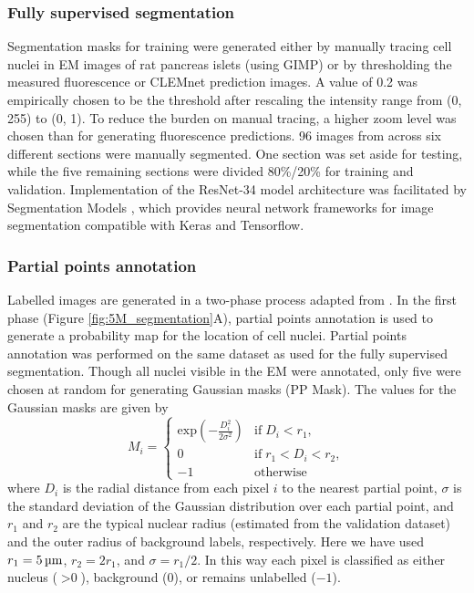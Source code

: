 \subsubsection{Fully supervised segmentation}

Segmentation masks for training were generated either by manually tracing cell nuclei in EM images of rat pancreas islets (using GIMP) or by thresholding the measured fluorescence or CLEMnet prediction images. A value of 0.2 was empirically chosen to be the threshold after rescaling the intensity range from (0, 255) to (0, 1). To reduce the burden on manual tracing, a higher zoom level was chosen than for generating fluorescence predictions. 96 images from across six different sections were manually segmented. One section was set aside for testing, while the five remaining sections were divided 80\%/20\% for training and validation. Implementation of the ResNet-34 model architecture was facilitated by Segmentation Models \cite{Yakubovskiy:2019}, which provides neural network frameworks for image segmentation compatible with Keras and Tensorflow.


\subsubsection{Partial points annotation}

Labelled images are generated in a two-phase process adapted from \textcite{qu2020weakly}. In the first phase (Figure \ref{fig:5M_segmentation}A), partial points annotation is used to generate a probability map for the location of cell nuclei. Partial points annotation was performed on the same dataset as used for the fully supervised segmentation. Though all nuclei visible in the EM were annotated, only five were chosen at random for generating Gaussian masks (PP Mask). The values for the Gaussian masks are given by
%
\begin{equation}
    M_i = 
    \begin{cases}
        \text{exp}\left({-\frac{D_i^2}{2\sigma^2}}\right) & \text{if}\; D_i < r_1, \\
        0 & \text{if}\; r_1 < D_i < r_2, \\
        -1 & \text{otherwise}
    \end{cases}
\end{equation}
%
where $D_i$ is the radial distance from each pixel $i$ to the nearest partial point, $\sigma$ is the standard deviation of the Gaussian distribution over each partial point, and $r_1$ and $r_2$ are the typical nuclear radius (estimated from the validation dataset) and the outer radius of background labels, respectively. Here we have used $r_1=\text{\SI{5}{\micro\meter}}$, $r_2 = 2 r_1$, and $\sigma = r_1 / 2$. In this way each pixel is classified as either nucleus ($>\text{0}$), background (0), or remains unlabelled ($-\text{1}$).

